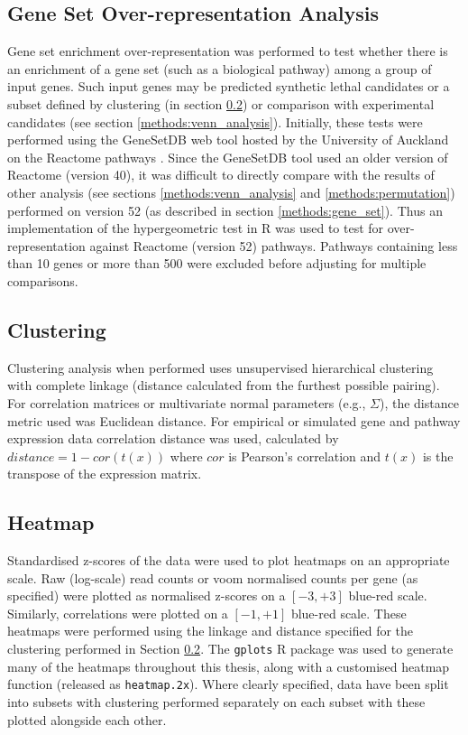 \subsection{Gene Set Over-representation Analysis} \label{methods:enrichment}
Gene set enrichment over-representation was performed to test whether there is an enrichment of a gene set (such as a biological pathway) among a group of input genes. Such input genes may be predicted synthetic lethal candidates or a subset defined by clustering (in section \ref{methods:clustering}) or comparison with experimental candidates (see section \ref{methods:venn_analysis}). Initially, these tests were performed using the GeneSetDB web tool \citep{genesetdb} hosted by the University of Auckland on the Reactome pathways \citep{Reactome}. Since the GeneSetDB tool used an older version of Reactome (version 40), it was difficult to directly compare with the results of other analysis (see sections \ref{methods:venn_analysis} and \ref{methods:permutation}) performed on version 52 (as described in  section \ref{methods:gene_set}). Thus an implementation of the hypergeometric test in R \citep{R_core} was used to test for over-representation against Reactome (version 52) pathways. Pathways containing less than 10 genes or more than 500 \citep[as performed in GeneSetDB by][]{genesetdb} were excluded before adjusting for multiple comparisons.

\subsection{Clustering} \label{methods:clustering}
Clustering analysis when performed uses unsupervised hierarchical clustering with complete linkage (distance calculated from the furthest possible pairing). For correlation matrices or multivariate normal parameters (e.g., $\Sigma$), the distance metric used was Euclidean distance. For empirical or simulated gene and pathway expression data correlation distance was used, calculated by $distance = 1 - cor(t(x))$ where $cor$ is Pearson's correlation and $t(x)$ is the transpose of the expression matrix. 

\subsection{Heatmap} \label{methods:heatmap}
Standardised z-scores of the data were used to plot heatmaps on an appropriate scale. Raw (log-scale) read counts or voom normalised counts per gene (as specified) were plotted  as normalised z-scores on a $[-3,+3]$ blue-red scale. Similarly, correlations were plotted on a $[-1,+1]$ blue-red scale. These heatmaps were performed using the linkage and distance specified for the clustering performed in Section \ref{methods:clustering}. The \texttt{gplots} R package \citep{gplots} was used to generate many of the heatmaps throughout this thesis, along with a customised heatmap function (released as \texttt{heatmap.2x}). Where clearly specified, data have been split into subsets with clustering performed separately on each subset with these plotted alongside each other.

